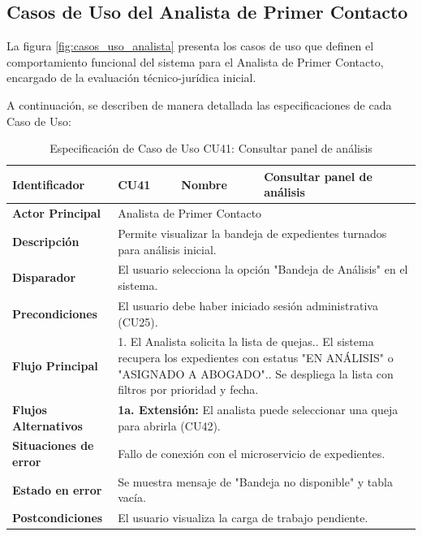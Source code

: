 \subsection{Casos de Uso del Analista de Primer Contacto}
\label{subsec:casos_uso_analista}

La figura \ref{fig:casos_uso_analista} presenta los casos de uso que definen el comportamiento funcional del sistema para el Analista de Primer Contacto, encargado de la evaluación técnico-jurídica inicial.

A continuación, se describen de manera detallada las especificaciones de cada Caso de Uso:

\vspace{0.5cm}

\begingroup
\setlength{\parskip}{0pt}
\begin{longtable}{|p{3.5cm}|p{2cm}|p{2.5cm}|p{7cm}|}
\caption{Especificación de Caso de Uso CU41: Consultar panel de análisis}
\label{tab:cu41} \\
\hline
\textbf{Identificador} & CU41 & \textbf{Nombre} & Consultar panel de análisis \\ \hline
\textbf{Actor Principal} & \multicolumn{3}{p{11.5cm}|}{Analista de Primer Contacto} \\ \hline
\textbf{Descripción} & \multicolumn{3}{p{11.5cm}|}{Permite visualizar la bandeja de expedientes turnados para análisis inicial.} \\ \hline
\textbf{Disparador} & \multicolumn{3}{p{11.5cm}|}{El usuario selecciona la opción "Bandeja de Análisis" en el sistema.} \\ \hline
\textbf{Precondiciones} & \multicolumn{3}{p{11.5cm}|}{El usuario debe haber iniciado sesión administrativa (CU25).} \\ \hline
\textbf{Flujo Principal} & \multicolumn{3}{p{11.5cm}|}{1. El Analista solicita la lista de quejas.\newline 2. El sistema recupera los expedientes con estatus "EN ANÁLISIS" o "ASIGNADO A ABOGADO".\newline 3. Se despliega la lista con filtros por prioridad y fecha.} \\ \hline
\textbf{Flujos Alternativos} & \multicolumn{3}{p{11.5cm}|}{\textbf{1a. Extensión:} El analista puede seleccionar una queja para abrirla (CU42).} \\ \hline
\textbf{Situaciones de error} & \multicolumn{3}{p{11.5cm}|}{Fallo de conexión con el microservicio de expedientes.} \\ \hline
\textbf{Estado en error} & \multicolumn{3}{p{11.5cm}|}{Se muestra mensaje de "Bandeja no disponible" y tabla vacía.} \\ \hline
\textbf{Postcondiciones} & \multicolumn{3}{p{11.5cm}|}{El usuario visualiza la carga de trabajo pendiente.} \\ \hline
\end{longtable}
\endgroup

